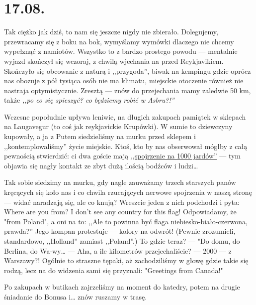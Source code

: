 \chapter*{17.08.}

Tak ciężko jak dziś, to nam się jeszcze nigdy nie zbierało. Dolegujemy, przewracamy się z boku na bok, wymyślamy wymówki dlaczego nie chcemy wypełznąć z namiotów. Wszystko to z bardzo prostego powodu --- mentalnie wyjazd skończył się wczoraj, z chwilą wjechania na  przed Reykjavikiem. Skończyło się obcowanie z naturą i ,,przygoda'', biwak na kempingu gdzie oprócz nas obozuje z pół tysiąca osób nie ma klimatu, miejsckie otoczenie również nie nastraja optymistycznie. Zresztą --- znów do przejechania mamy zaledwie 50 km, także \emph{,,po co się spieszyć? co będziemy robić w Asbru?!''}

Wczesne popołudnie upływa leniwie, na długich zakupach pamiątek w sklepach na Laugavegur (to coś jak reykjavickie Krupówki). W sumie to dziewczyny kupowały, a ja z Putem siedzieliśmy na murku przed sklepem i ,,kontemplowaliśmy'' życie miejskie. Ktoś, kto by nas obserwował mógłby z całą pewnością stwierdzić: ci dwa goście mają \href{http://en.wikipedia.org/wiki/Thousand-yard_stare}{,,spojrzenie na 1000 jardów''} --- tym objawia się nagły kontakt ze zbyt dużą ilością bodźców i ludzi…


Tak sobie siedzimy na murku, gdy nagle zauważamy trzech starszych panów kręcących się koło nas i co chwila rzucających nerwowe spojrzenia w naszą stronę --- widać naradzają się, ale co knują? Wreszcie jeden z nich podchodzi i pyta: Where are you from? I don’t see any country for this flag! Odpowiadamy, że "from Poland", a oni na to: ,,Ale to powinna być flaga niebiesko-biało-czerwona, prawda?'' Jego kompan protestuje --- kolory na odwrót! (Pewnie zrozumieli, standardowo, ,,Holland'' zamiast ,,Poland''.) To gdzie teraz? --- "Do domu, do Berlina, do Wa-wy… --- Aha, a ile kilometrów przejechaliście? --- 2000 --- z Warszawy?! Ogólnie to straszne tępaki, aż zachodziliśmy w głowę gdzie takie się rodzą, lecz na do widzenia sami się przyznali: "Greetings from Canada!"

Po zakupach w butikach zajrzeliśmy na moment do katedry, potem na drugie śniadanie do Bonusa i… znów ruszamy w trasę.

